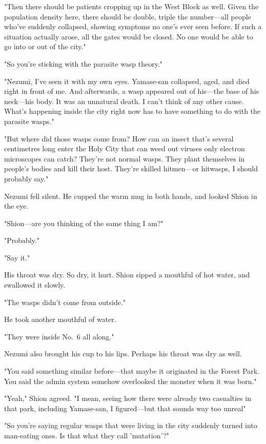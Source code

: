 "Then there should be patients cropping up in the West Block as well.
Given the population density here, there should be double, triple the
number---all people who've suddenly collapsed, showing symptoms no one's
ever seen before. If such a situation actually arose, all the gates
would be closed. No one would be able to go into or out of the city."

"So you're sticking with the parasite wasp theory."

"Nezumi, I've seen it with my own eyes. Yamase-san collapsed, aged, and
died right in front of me. And afterwards, a wasp appeared out of
his---the base of his neck---his body. It was an unnatural death. I can't
think of any other cause. What's happening inside the city right now has
to have something to do with the parasite wasps."

"But where did those wasps come from? How can an insect that's several
centimetres long enter the Holy City that can weed out viruses only
electron microscopes can catch? They're not normal wasps. They plant
themselves in people's bodies and kill their host. They're skilled
hitmen---or hitwasps, I should probably say."

Nezumi fell silent. He cupped the warm mug in both hands, and looked
Shion in the eye.

"Shion---are you thinking of the same thing I am?"

"Probably."

"Say it."

His throat was dry. So dry, it hurt. Shion sipped a mouthful of hot
water, and swallowed it slowly.

"The wasps didn't come from outside."

He took another mouthful of water.

"They were inside No.~6 all along."

Nezumi also brought his cup to his lips. Perhaps his throat was dry as
well.

"You said something similar before---that maybe it originated in the
Forest Park. You said the admin system somehow overlooked the monster
when it was born."

"Yeah," Shion agreed. "I mean, seeing how there were already two
casualties in that park, including Yamase-san, I figured---but that sounds
way too unreal\el "

"So you're saying regular wasps that were living in the city suddenly
turned into man-eating ones. Is that what they call 'mutation'?"

